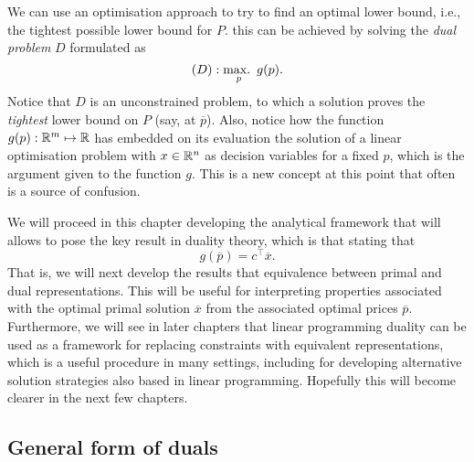 We can use an optimisation approach to try to find an optimal lower bound, i.e., the tightest possible lower bound for $P$. this can be achieved by solving the \emph{dual problem} $D$ formulated as 
%
\begin{equation*}
	(D) : \mathop{\text{max.~}}_p g(p).
\end{equation*}
%
Notice that $D$ is an unconstrained problem, to which a solution proves the \emph{tightest} lower bound on $P$ (say, at $\overline{p}$). Also, notice how the function $g(p) : \mathbb{R}^m \mapsto \mathbb{R}$ has embedded on its evaluation the solution of a linear optimisation problem with $x \in \mathbb{R}^n$ as decision variables for a fixed $p$, which is the argument given to the function $g$. This is a new concept at this point that often is a source of confusion. 

We will proceed in this chapter developing the analytical framework that will allows to pose the key result in duality theory, which is that stating that 
%
\begin{equation*}
	g(\overline{p}) = c^\top \overline{x}.	
\end{equation*}
%
That is, we will next develop the results that equivalence between primal and dual representations. This will be useful for interpreting properties associated with the optimal primal solution $\overline{x}$ from the associated optimal prices $\overline{p}$. Furthermore, we will see in later chapters that linear programming duality can be used as a framework for replacing constraints with equivalent representations, which is a useful procedure in many settings, including for developing alternative solution strategies also based in linear programming. Hopefully this will become clearer in the next few chapters.


\subsection{General form of duals}

